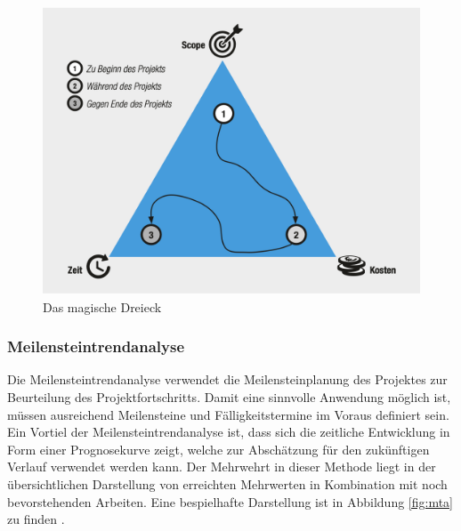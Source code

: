 \documentclass[ThesisDJ.tex]{subfiles}
\begin{document}
    \begin{figure}
        \includegraphics[scale=0.5]{magic_tri.png}
        \centering
        \caption{Das magische Dreieck}
        \label{fig:magic_tri}
    \end{figure}

    \subsubsection{Meilensteintrendanalyse}
    Die Meilensteintrendanalyse verwendet die Meilensteinplanung des Projektes zur Beurteilung des Projektfortschritts.
    Damit eine sinnvolle Anwendung möglich ist, müssen ausreichend Meilensteine und Fälligkeitstermine im Voraus definiert sein.
    Ein Vortiel der Meilensteintrendanalyse ist, dass sich die zeitliche Entwicklung in Form einer Prognosekurve zeigt, welche 
    zur Abschätzung für den zukünftigen Verlauf verwendet werden kann. Der Mehrwehrt in dieser Methode liegt in der 
    übersichtlichen Darstellung von erreichten Mehrwerten in Kombination mit noch bevorstehenden Arbeiten. Eine bespielhafte Darstellung ist in Abbildung
    \ref{fig:mta} zu finden \cite[S.~192]{kuster_handbuch_2022}.
\end{document}
